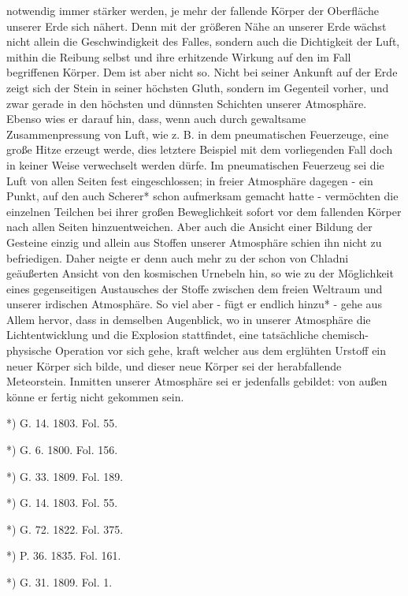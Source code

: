 \documentclass[a4paper, 11pt, oneside, polutonikogreek, german]{article}
\begin{document}
notwendig immer stärker werden, je mehr der fallende Körper der Oberfläche unserer Erde sich nähert. Denn mit der größeren Nähe an unserer Erde wächst nicht allein die Geschwindigkeit des Falles, sondern auch die Dichtigkeit der Luft, mithin die Reibung selbst und ihre erhitzende Wirkung auf den im Fall begriffenen Körper. Dem ist aber nicht so. Nicht bei seiner Ankunft auf der Erde zeigt sich der Stein in seiner höchsten Gluth, sondern im Gegenteil vorher, und zwar gerade in den höchsten und dünnsten Schichten unserer Atmosphäre. Ebenso wies er darauf hin, dass, wenn auch durch gewaltsame Zusammenpressung von Luft, wie z. B. in dem pneumatischen Feuerzeuge, eine große Hitze erzeugt werde, dies letztere Beispiel mit dem vorliegenden Fall doch in keiner Weise verwechselt werden dürfe. Im pneumatischen Feuerzeug sei die Luft von allen Seiten fest eingeschlossen; in freier Atmosphäre dagegen - ein Punkt, auf den auch Scherer* schon aufmerksam gemacht hatte - vermöchten die einzelnen Teilchen bei ihrer großen Beweglichkeit sofort vor dem fallenden Körper nach allen Seiten hinzuentweichen. Aber auch die Ansicht einer Bildung der Gesteine einzig und allein aus Stoffen unserer Atmosphäre schien ihn nicht zu befriedigen. Daher neigte er denn auch mehr zu der schon von Chladni geäußerten Ansicht von den kosmischen Urnebeln hin, so wie zu der Möglichkeit eines gegenseitigen Austausches der Stoffe zwischen dem freien Weltraum und unserer irdischen Atmosphäre. So viel aber - fügt er endlich hinzu* - gehe aus Allem hervor, dass in demselben Augenblick, wo in unserer Atmosphäre die Lichtentwicklung und die Explosion stattfindet, eine tatsächliche chemisch-physische Operation vor sich gehe, kraft welcher aus dem erglühten Urstoff ein neuer Körper sich bilde, und dieser neue Körper sei der herabfallende Meteorstein. Inmitten unserer Atmosphäre sei er jedenfalls gebildet: von außen könne er fertig nicht gekommen sein.

*) G. 14. 1803. Fol. 55.

*) G. 6. 1800. Fol. 156.

*) G. 33. 1809. Fol. 189.

*) G. 14. 1803. Fol. 55.

*) G. 72. 1822. Fol. 375.

*) P. 36. 1835. Fol. 161.

*) G. 31. 1809. Fol. 1.
\end{document}
